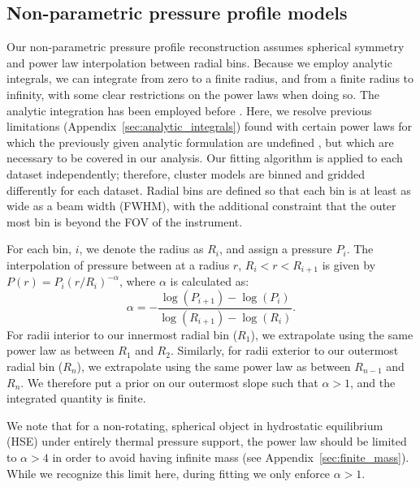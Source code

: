 \documentclass[onecolumn,traditabstract]{aa}
\begin{document}
\subsection{Non-parametric pressure profile models}
\label{sec:np_models}

Our non-parametric pressure profile reconstruction assumes spherical symmetry and power law interpolation between radial bins.
Because we employ analytic integrals, we can integrate from zero to a finite radius, and from a finite radius to infinity,
with some clear restrictions on the power
laws when doing so. The analytic integration has been employed before \citep[e.g.,][]{vikhlinin2001a,korngut2011,sarazin2016}.
Here, we resolve  previous limitations (Appendix~\ref{sec:analytic_integrals}) found with certain power laws for which the
previously given analytic formulation are undefined \citep{korngut2011,sarazin2016}, but which are necessary to be covered
in our analysis.
Our fitting algorithm is applied
to each dataset independently; therefore, cluster models are binned and gridded differently for each dataset.
Radial bins are defined so that
each bin is at least as wide as a beam width (FWHM), with the additional constraint that the outer most bin
is beyond the FOV of the instrument.

For each bin, $i$, we denote the radius as $R_i$, and assign a pressure $P_i$. The interpolation of pressure
between at a radius $r$, $R_i < r < R_{i+1}$ is given by $P(r) = P_i (r/R_{i})^{-\alpha}$, where $\alpha$ is
calculated as:
\begin{equation}
  \alpha = -\frac{\log(P_{i+1}) - \log(P_i)}{\log(R_{i+1}) - \log(R_i)}.
\end{equation}
For radii interior to our innermost radial bin ($R_1$), we extrapolate using the same power law as between $R_1$ and
$R_2$. Similarly, for radii exterior to our outermost radial bin ($R_n$), we extrapolate using the same power law as
between $R_{n-1}$ and $R_n$. We therefore put a prior on our outermost slope such that $\alpha > 1$, and the integrated
quantity is finite.

We note that for a non-rotating, spherical object in hydrostatic equilibrium (HSE) under entirely thermal pressure
support, the power law should be
limited to $\alpha >4$ in order to avoid having infinite mass (see Appendix~\ref{sec:finite_mass}). While we recognize
this limit here, during fitting we only enforce $\alpha > 1$.
\end{document}
